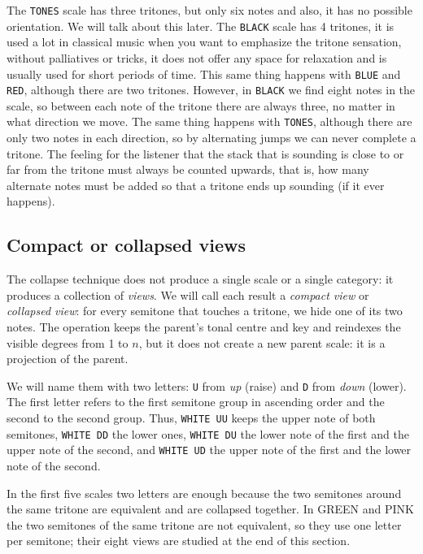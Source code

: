 \documentclass[]{report}
\begin{document}
The \texttt{TONES} scale has three tritones, but only six notes and also, it has no possible orientation. We will talk about this later.
The \texttt{BLACK} scale has 4 tritones, it is used a lot in classical music when you want to emphasize the tritone sensation, without palliatives or tricks, it does not offer any space for relaxation and is usually used for short periods of time.
This same thing happens with \texttt{BLUE} and \texttt{RED}, although there are two tritones.
However, in \texttt{BLACK} we find eight notes in the scale, so between each note of the tritone there are always three, no matter in what direction we move.
The same thing happens with \texttt{TONES}, although there are only two notes in each direction, so by alternating jumps we can never complete a tritone.
The feeling for the listener that the stack that is sounding is close to or far from the tritone must always be counted upwards, that is, how many alternate notes must be added so that a tritone ends up sounding (if it ever happens).

\subsection{Compact or collapsed views}
\label{sec:collapse-views}

The collapse technique does not produce a single scale or a single category:
it produces a collection of \emph{views}. We will call each
result a \emph{compact view} or \emph{collapsed view}: for every semitone that
touches a tritone, we hide one of its two notes. The operation keeps the
parent's tonal centre and key and reindexes the visible degrees from 1 to $n$,
but it does not create a new parent scale: it is a projection of the parent.

We will name them with two letters: \texttt{U} from \emph{up} (raise) and
\texttt{D} from \emph{down} (lower). The first letter refers to the first
semitone group in ascending order and the second to the second group. Thus,
\texttt{WHITE UU} keeps the upper note of both semitones, \texttt{WHITE DD} the
lower ones, \texttt{WHITE DU} the lower note of the first and the upper note of
the second, and \texttt{WHITE UD} the upper note of the first and the lower note
of the second.

In the first five scales two letters are enough because the two semitones
around the same tritone are equivalent and are collapsed together. In \textsf{GREEN} and
\textsf{PINK} the two semitones of the same tritone are not equivalent, so they
use one letter per semitone; their eight views are studied at the end of this
section.
\end{document}
